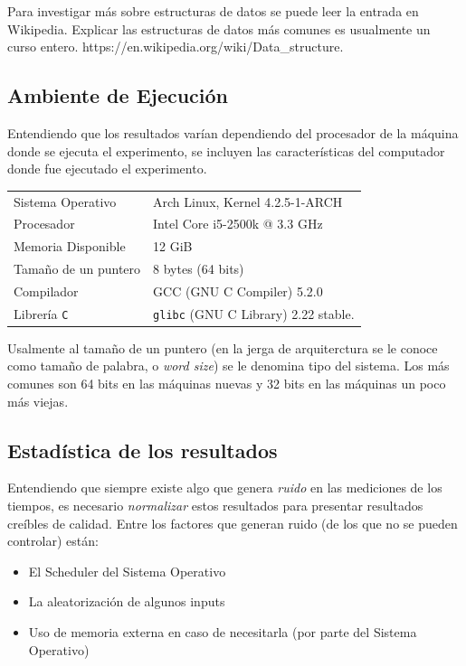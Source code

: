 \documentclass[12pt,letterpaper]{report}
\begin{document}
Para investigar más sobre estructuras de datos se puede leer la entrada en Wikipedia. Explicar las estructuras de datos más comunes es usualmente un curso entero. https://en.wikipedia.org/wiki/Data\_structure.

\subsection{Ambiente de Ejecución}
\label{subsec:ambiente}

Entendiendo que los resultados varían dependiendo del procesador de la máquina donde se ejecuta el experimento, se incluyen las características del computador donde fue ejecutado el experimento.

\begin{center}

\begin{tabular}{ll}
  Sistema Operativo & Arch Linux, Kernel 4.2.5-1-ARCH\\
  Procesador & Intel Core i5-2500k @ 3.3 GHz\\
  Memoria Disponible & 12 GiB\\
  Tamaño de un puntero & 8 bytes (64 bits)\\
  Compilador & GCC (GNU C Compiler) 5.2.0\\
  Librería \texttt{C} & \texttt{glibc} (GNU C Library) 2.22 stable.
\end{tabular}
\end{center}

Usalmente al tamaño de un puntero (en la jerga de arquiterctura se le conoce como tamaño de palabra, o \emph{word size}) se le denomina tipo del sistema. Los más comunes son 64 bits en las máquinas nuevas y 32 bits en las máquinas un poco más viejas.

\subsection{Estadística de los resultados}
\label{subsec:estadistica}

Entendiendo que siempre existe algo que genera \emph{ruido} en las mediciones de los tiempos, es necesario \emph{normalizar} estos resultados para presentar resultados creíbles de calidad. Entre los factores que generan ruido (de los que no se pueden controlar) están:

\begin{itemize}
\item El Scheduler del Sistema Operativo
\item La aleatorización de algunos inputs
\item Uso de memoria externa en caso de necesitarla (por parte del Sistema Operativo)
\end{itemize}
\end{document}
